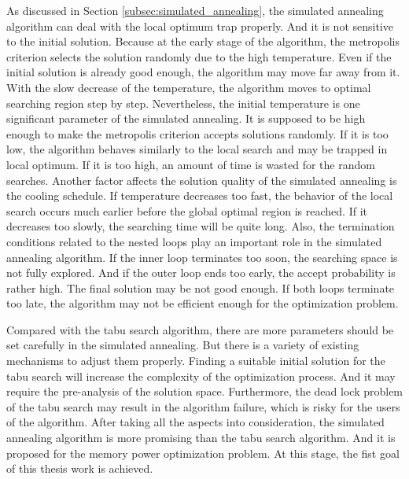 	As discussed in Section \ref{subsec:simulated_annealing}, the simulated
	annealing algorithm can deal with the local optimum trap properly.
	And it is not sensitive to the initial solution. Because at the early
	stage of the algorithm, the metropolis criterion selects the solution
	randomly due to the high temperature. Even if the initial solution is
	already good enough, the algorithm may move far away from it. With the
	slow decrease of the temperature, the algorithm moves to optimal searching
	region step by step.
	Nevertheless, the initial temperature is one significant parameter of the
	simulated annealing. It is supposed to be high enough to make the metropolis
	criterion accepts solutions randomly. If it is too low, the algorithm
	behaves similarly to the local search and may be trapped in local optimum.
	If it is too high, an amount of time is wasted for the random searches.
	Another factor affects the solution quality of the simulated annealing is the
	cooling schedule. If temperature decreases too fast, the behavior of the local
	search occurs much earlier before the global optimal region is reached.
	If it decreases too slowly, the searching time will be quite long.
	Also, the termination conditions related to the nested loops play an important
	role in the simulated annealing algorithm. If the inner loop terminates too
	soon, the searching space is not fully explored. And if the outer loop ends too
	early, the accept probability is rather high. The final solution may be not
	good enough. If both loops terminate too late, the algorithm may not be efficient
	enough for the optimization problem.
	
	Compared with the tabu search algorithm, there are more parameters should be set
	carefully in the simulated annealing. But there is a variety of existing mechanisms
	to adjust them properly. Finding a suitable initial solution for the tabu search
	will increase the complexity of the optimization process.
	And it may require the pre-analysis of the solution space. Furthermore, the
	dead lock problem of the tabu search may result in the algorithm failure,
	which is risky for the users of the algorithm. After taking all the
	aspects into consideration, the simulated annealing algorithm is more
	promising than the tabu search algorithm. And it is proposed for the memory
	power optimization problem. At this stage, the fist goal of this thesis work
	is achieved.
	
